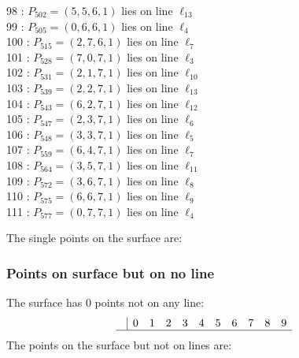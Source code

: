 \documentclass{article}
\begin{document}
{\begin{multicols}{2}
98 : $P_{502}=( 5, 5, 6, 1 )$ lies on line $\ell_{13}$\\
99 : $P_{505}=( 0, 6, 6, 1 )$ lies on line $\ell_{4}$\\
100 : $P_{515}=( 2, 7, 6, 1 )$ lies on line $\ell_{7}$\\
101 : $P_{528}=( 7, 0, 7, 1 )$ lies on line $\ell_{3}$\\
102 : $P_{531}=( 2, 1, 7, 1 )$ lies on line $\ell_{10}$\\
103 : $P_{539}=( 2, 2, 7, 1 )$ lies on line $\ell_{13}$\\
104 : $P_{543}=( 6, 2, 7, 1 )$ lies on line $\ell_{12}$\\
105 : $P_{547}=( 2, 3, 7, 1 )$ lies on line $\ell_{6}$\\
106 : $P_{548}=( 3, 3, 7, 1 )$ lies on line $\ell_{5}$\\
107 : $P_{559}=( 6, 4, 7, 1 )$ lies on line $\ell_{7}$\\
108 : $P_{564}=( 3, 5, 7, 1 )$ lies on line $\ell_{11}$\\
109 : $P_{572}=( 3, 6, 7, 1 )$ lies on line $\ell_{8}$\\
110 : $P_{575}=( 6, 6, 7, 1 )$ lies on line $\ell_{9}$\\
111 : $P_{577}=( 0, 7, 7, 1 )$ lies on line $\ell_{4}$\\
\end{multicols}
The single points on the surface are:\\
\subsubsection*{Points on surface but on no line}
The surface has 0 points not on any line:\\
$$
\begin{array}{r|*{10}{r}}
 & 0 & 1 & 2 & 3 & 4 & 5 & 6 & 7 & 8 & 9\\
\hline
\end{array}
$$
The points on the surface but not on lines are:\\
\begin{multicols}{2}
\noindent
\end{multicols}
}
\end{document}
